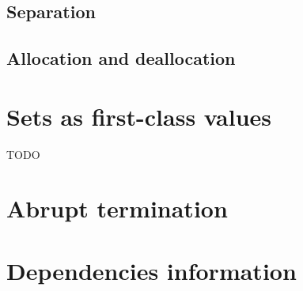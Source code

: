 \subsection{Separation}
\label{sec:separated}

\absent


\subsection{Allocation and deallocation}

\absent


\section{Sets as first-class values}

TODO


\section{Abrupt termination}
\label{sec:abrupt-clauses}

\absent


\section{Dependencies information}
\label{sec:func-dep}

\absent


